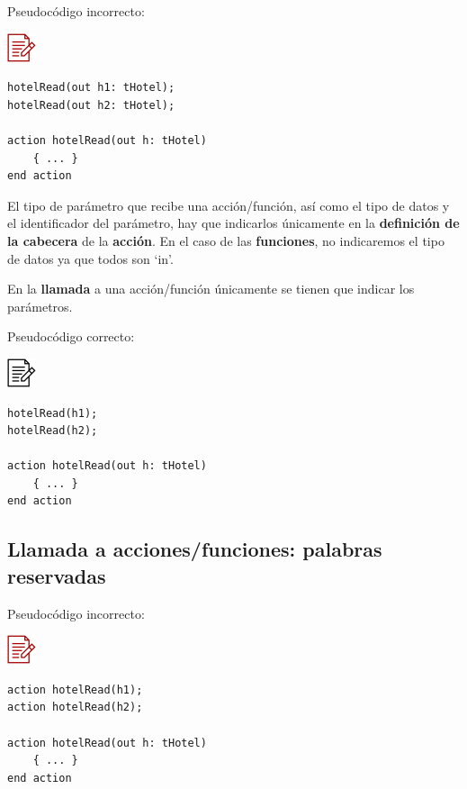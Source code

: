 \documentclass[
]{book}
\begin{document}
Pseudocódigo incorrecto:

\includegraphics{./img/alg_err.png}

\begin{verbatim}
hotelRead(out h1: tHotel);
hotelRead(out h2: tHotel);

action hotelRead(out h: tHotel)
    { ... }
end action
\end{verbatim}

El tipo de parámetro que recibe una acción/función, así como el tipo de datos y el identificador del parámetro, hay que indicarlos únicamente en la \textbf{definición de la cabecera} de la \textbf{acción}. En el caso de las \textbf{funciones}, no indicaremos el tipo de datos ya que todos son `in'.

En la \textbf{llamada} a una acción/función únicamente se tienen que indicar los parámetros.

Pseudocódigo correcto:

\includegraphics{./img/alg.png}

\begin{verbatim}
hotelRead(h1);
hotelRead(h2);

action hotelRead(out h: tHotel)
    { ... }
end action
\end{verbatim}

\hypertarget{llamada-a-accionesfunciones-palabras-reservadas}{%
\subsection{Llamada a acciones/funciones: palabras reservadas}\label{llamada-a-accionesfunciones-palabras-reservadas}}

Pseudocódigo incorrecto:

\includegraphics{./img/alg_err.png}

\begin{verbatim}
action hotelRead(h1);
action hotelRead(h2);

action hotelRead(out h: tHotel)
    { ... }
end action
\end{verbatim}
\end{document}
